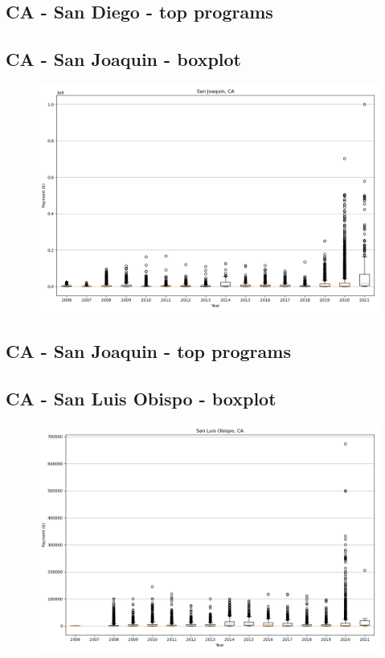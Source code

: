 \subsection*{CA - San Diego - top programs}

\newpage
\subsection*{CA - San Joaquin - boxplot}
\begin{figure}[h]
\centering
\includegraphics[width=7in]{../output/boxplots/counties/San Joaquin-CA_boxplot.png}
\end{figure}


\subsection*{CA - San Joaquin - top programs}

\newpage
\subsection*{CA - San Luis Obispo - boxplot}
\begin{figure}[h]
\centering
\includegraphics[width=7in]{../output/boxplots/counties/San Luis Obispo-CA_boxplot.png}
\end{figure}


